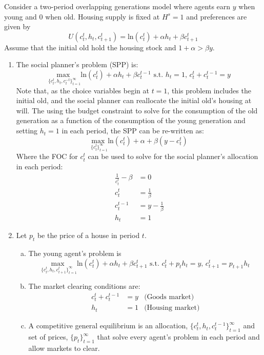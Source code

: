 \documentclass{article}
\newcommand{\loge}[1]{\text{ln}\left(#1\right)}
\newcommand{\usmax}[1]{\underset{#1}{\text{max }}}
\begin{document}
\noindent Consider a two-period overlapping generations model where agents earn $y$ when young and $0$ when old. Housing supply is fixed at $H^s=1$ and preferences are given by 
\[
	U(c_t^t,h_t,c_{t+1}^t) = \loge{c_t^t} + \alpha h_t + \beta c_{t+1}^t 
\]
Assume that the initial old hold the housing stock and $1+\alpha > \beta y$.
\begin{enumerate}
	\item The social planner's problem (SPP) is:
		\[
			\usmax{\{c_t^t,h_t,c^{-t}_t\}^\infty_{t=1}}\loge{c_t^t} + \alpha h_t + \beta c^{t-1}_t \text{ s.t. } h_t=1\text{, }c_t^t+c_t^{t-1}=y
		\]
		Note that, as the choice variables begin at $t=1$, this problem includes the initial old, and the social planner can reallocate the initial old's housing at will. The using the budget constraint to solve for the consumption of the old generation as a function of the consumption of the young generation and setting $h_t=1$ in each period, the SPP can be re-written as:
		\[
			\usmax{\{c_t^t\}^\infty_{t=1}}\loge{c_t^t} + \alpha + \beta (y-c_t^t)
		\]
		Where the FOC for $c_t^t$ can be used to solve for the social planner's allocation in each period:
		\begin{align*}
			\frac{1}{c_t^t}-\beta &= 0	\\
			c_t^t &= \frac{1}{\beta}	\\
			c_t^{t-1} &= y-\frac{1}{\beta}	\\
			h_t &= 1
		\end{align*}
		
	\pagebreak	
	\item Let $p_t$ be the price of a house in period $t$.
		\begin{enumerate}[(a)]
			\item The young agent's problem is 
				\[
					\usmax{\{c_t^t,h_t,c_{t+1}^t\}^\infty_{t=1}}\loge{c_t^t} + \alpha h_t + \beta c_{t+1}^t \text{ s.t. } c_t^t + p_th_t = y\text{, }c_{t+1}^t = p_{t+1}h_t
				\]
				
			\item The market clearing conditions are:
				\begin{align*}
					c_t^t + c_t^{t-1} 	&= y &\text{(Goods market)} 	\\
								h_t 	&= 1 &\text{(Housing market)} 
				\end{align*}
			
			\item A competitive general equilibrium is an allocation, $\{c_t^t,h_t,c_t^{t-1}\}_{t=1}^\infty$ and set of prices, $\{p_t\}_{t=1}^\infty$ that solve every agent's problem in each period and allow markets to clear.
			

\end{enumerate}
\end{enumerate}
\end{document}
